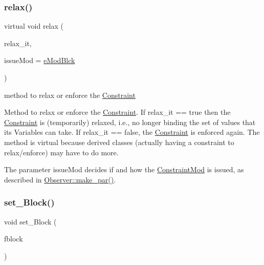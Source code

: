 \subsubsection{\texorpdfstring{relax()}{relax()}}
{\footnotesize\ttfamily virtual void relax (\begin{DoxyParamCaption}\item[{bool}]{relax\+\_\+it,  }\item[{\mbox{\hyperlink{group___modification___t_y_p_e_s_ga544246d8c462e9a2d817c2c30797968f}{c\+\_\+\+Mod\+Param}}}]{issue\+Mod = {\ttfamily \mbox{\hyperlink{group___modification___t_y_p_e_s_gga48fddcdd03a03f49b7e389ca1ed938d4a21b14b26b1c0093a0905f6fc010bad29}{e\+Mod\+Blck}}} }\end{DoxyParamCaption})\hspace{0.3cm}{\ttfamily [virtual]}}



method to relax or enforce the \mbox{\hyperlink{class_s_m_spp__di__unipi__it_1_1_constraint}{Constraint}} 

Method to relax or enforce the \mbox{\hyperlink{class_s_m_spp__di__unipi__it_1_1_constraint}{Constraint}}. If relax\+\_\+it == true then the \mbox{\hyperlink{class_s_m_spp__di__unipi__it_1_1_constraint}{Constraint}} is (temporarily) relaxed, i.\+e., no longer binding the set of values that its Variables can take. If relax\+\_\+it == false, the \mbox{\hyperlink{class_s_m_spp__di__unipi__it_1_1_constraint}{Constraint}} is enforced again. The method is virtual because derived classes (actually having a constraint to relax/enforce) may have to do more.

The parameter issue\+Mod decides if and how the \mbox{\hyperlink{class_s_m_spp__di__unipi__it_1_1_constraint_mod}{Constraint\+Mod}} is issued, as described in \mbox{\hyperlink{class_s_m_spp__di__unipi__it_1_1_observer_a2d499ae38e5e95cf66cd71da32b0694a}{Observer\+::make\+\_\+par()}}. \mbox{\label{class_s_m_spp__di__unipi__it_1_1_constraint_ae25adfb4d0355dc999de19a850b0025d}} 
\subsubsection{\texorpdfstring{set\+\_\+\+Block()}{set\_Block()}}
{\footnotesize\ttfamily void set\+\_\+\+Block (\begin{DoxyParamCaption}\item[{\mbox{\hyperlink{class_s_m_spp__di__unipi__it_1_1_block}{Block}} $\ast$}]{fblock }\end{DoxyParamCaption})\hspace{0.3cm}{\ttfamily [inline]}}



